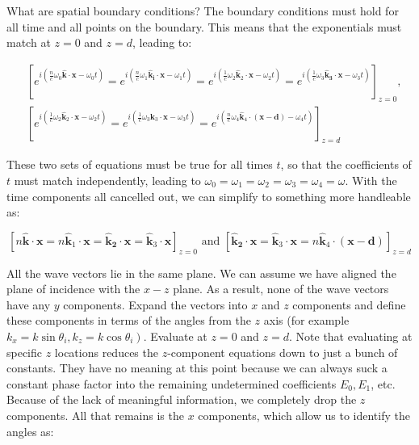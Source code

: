 What are spatial boundary conditions? The boundary conditions must hold for all time and all points on the boundary. This means that the exponentials must match at $z=0$ and $z=d$, leading to:

\begin{equation}
	\begin{split}
		&{\left[e^{i\left(\frac{n}{c} \omega_{0} \hat{\mathbf{k}} \cdot \mathbf{x}-\omega_{0} t\right)}=e^{i\left(\frac{n}{c} \omega_{1} \hat{\mathbf{k}}_{\mathbf{i}} \cdot \mathbf{x}-\omega_{1} t\right)}=e^{i\left(\frac{1}{c} \omega_{2} \hat{\mathbf{k}}_{2} \cdot \mathbf{x}-\omega_{2} t\right)}=e^{i\left(\frac{1}{c} \omega_{3} \hat{\mathbf{k}}_{\mathbf{3}} \cdot \mathbf{x}-\omega_{3} t\right)}\right]_{z=0},} \\
		&{\left[e^{i\left(\frac{1}{c} \omega_{2} \left.\hat{\mathbf{k}}_{2} \cdot \mathbf{x}-\omega_{2} t\right)\right.}=e^{i\left(\frac{1}{c} \omega_{3} \hat{\mathbf{k}}_{3} \cdot \mathbf{x}-\omega_{3} t\right)}=e^{i\left(\frac{n}{c} \omega_{4} \hat{\mathbf{k}}_{4} \cdot(\mathbf{x}-\mathbf{d})-\omega_{4} t\right)}\right]_{z=d}}
	\end{split}
\end{equation}

These two sets of equations must be true for all times $t$, so that the coefficients of $t$ must match independently, leading to $\omega_{0}=\omega_{1}=\omega_{2}=\omega_{3}=\omega_{4}=\omega$. With the time components all cancelled out, we can simplify to something more handleable as:

\begin{equation}
	\left[n \hat{\mathbf{k}} \cdot \mathbf{x}=n \hat{\mathbf{k}}_{1} \cdot \mathbf{x}=\hat{\mathbf{k}}_{\mathbf{2}} \cdot \mathbf{x}=\hat{\mathbf{k}}_{3} \cdot \mathbf{x}\right]_{z=0} \text { and }\left[\hat{\mathbf{k}}_{\mathbf{2}} \cdot \mathbf{x}=\hat{\mathbf{k}}_{3} \cdot \mathbf{x}=n \hat{\mathbf{k}}_{4} \cdot(\mathbf{x}-\mathbf{d})\right]_{z=d}
\end{equation}

All the wave vectors lie in the same plane. We can assume we have aligned the plane of incidence with the $x-z$ plane. As a result, none of the wave vectors have any $y$ components. Expand the vectors into $x$ and $z$ components and define these components in terms of the angles from the $z$ axis (for example $\left.k_{x}=k \sin \theta_{i}, k_{z}=k \cos \theta_{i}\right) .$ Evaluate at $z=0$ and $z=d$. Note that evaluating at specific $z$ locations reduces the $z$-component equations down to just a bunch of constants. They have no meaning at this point because we can always suck a constant phase factor into the remaining undetermined coefficients $E_{0}, E_{1}$, etc. Because of the lack of meaningful information, we completely drop the $z$ components. All that remains is the $x$ components, which allow us to identify the angles as:

